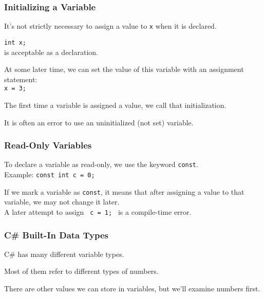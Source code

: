 \begin{frame}
\frametitle{Initializing a Variable}
It's not strictly necessary to assign a value to \texttt{x} when it is declared.

\texttt{int x;}\\
\quad is acceptable as a declaration.

At some later time, we can set the value of this variable with an assignment statement:\\
\quad \texttt{x = 3;}

The first time a variable is assigned a value, we call that \alert{initialization}.

It is often an error to use an uninitialized (not set) variable.

\end{frame}

\begin{frame}
\frametitle{Read-Only Variables}
To declare a variable as read-only, we use the keyword \alert{\texttt{const}}.\\
\quad Example: \texttt{const int c = 0;}

If we mark a variable as \texttt{const}, it means that after assigning a value to that variable, we may not change it later.\\
\quad A later attempt to assign \texttt{ c = 1; } is a compile-time error.

\end{frame}

\begin{frame}
\frametitle{C\# Built-In Data Types}

C\# has many different variable types.

Most of them refer to different types of numbers.

There are other values we can store in variables, but we'll examine numbers first.


\end{frame}

